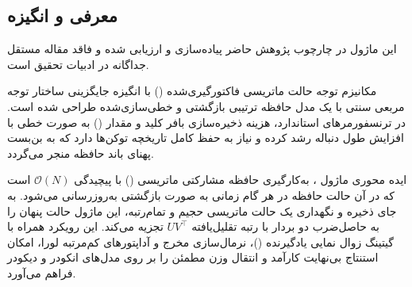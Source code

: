 \subsection{معرفی و انگیزه}
این ماژول در چارچوب پژوهش حاضر پیاده‌سازی و ارزیابی شده و فاقد مقاله مستقل جداگانه در ادبیات تحقیق است.

مکانیزم توجه حالت ماتریسی فاکتورگیری‌شده () با انگیزه جایگزینی ساختار توجه مربعی سنتی با یک مدل حافظه ترتیبی بازگشتی و خطی‌سازی‌شده طراحی شده است. در ترنسفورمرهای استاندارد، هزینه ذخیره‌سازی بافر کلید و مقدار () به صورت خطی با افزایش طول دنباله رشد کرده و نیاز به حفظ کامل تاریخچه توکن‌ها دارد که به بن‌بست پهنای باند حافظه منجر می‌گردد.

ایده محوری ماژول ، به‌کارگیری حافظه مشارکتی ماتریسی () با پیچیدگی $\mathcal{O}(N)$ است که در آن حالت حافظه در هر گام زمانی به صورت بازگشتی به‌روزرسانی می‌شود. به جای ذخیره و نگهداری یک حالت ماتریسی حجیم و تمام‌رتبه، این ماژول حالت پنهان را به حاصل‌ضرب دو بردار با رتبه تقلیل‌یافته $U V^\top$ تجزیه می‌کند. این رویکرد همراه با گیتینگ زوال نمایی یادگیرنده ()، نرمال‌سازی مخرج و آداپتورهای کم‌مرتبه لورا، امکان استنتاج بی‌نهایت کارآمد و انتقال وزن مطمئن را بر روی مدل‌های انکودر و دیکودر فراهم می‌آورد.
